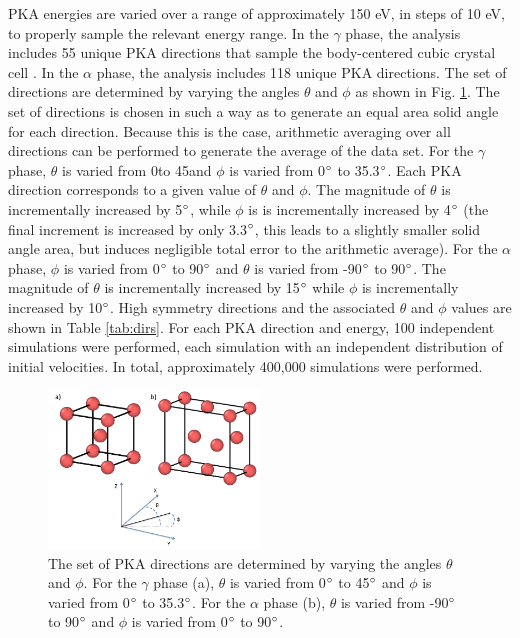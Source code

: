 \documentclass[review]{elsarticle}
\begin{document}
PKA energies are varied over a range of approximately 150 eV, in steps of 10 eV, to properly sample the relevant energy range. In the $\gamma$ phase, the analysis includes 55 unique PKA directions that sample the body-centered cubic crystal cell \cite{beeler2015}. In the $\alpha$ phase, the analysis includes 118 unique PKA directions. The set of directions are determined by varying the angles $\theta$ and $\phi$ as shown in Fig. \ref{fig:directions}. The set of directions is chosen in such a way as to generate an equal area solid angle for each direction. Because this is the case, arithmetic averaging over all directions can be performed to generate the average of the data set. For the $\gamma$ phase, $\theta$ is varied from 0\degree to 45\degree and $\phi$ is varied from 0$\degree$ to 35.3$\degree$. Each PKA direction corresponds to a given value of $\theta$ and $\phi$. The magnitude of $\theta$ is incrementally increased by 5$\degree$, while $\phi$ is is incrementally increased by 4$\degree$ (the final increment is increased by only 3.3$\degree$, this leads to a slightly smaller solid angle area, but induces negligible total error to the arithmetic average). For the $\alpha$ phase, $\phi$ is varied from 0$\degree$ to 90$\degree$ and $\theta$ is varied from -90$\degree$ to 90$\degree$. The magnitude of $\theta$ is incrementally increased by 15$\degree$  while $\phi$ is incrementally increased by 10$\degree$. High symmetry directions and the associated $\theta$ and $\phi$ values are shown in Table \ref{tab:dirs}. For each PKA direction and energy, 100 independent simulations were performed, each simulation with an independent distribution of initial velocities. In total, approximately 400,000 simulations were performed. 

\begin{figure}[h]
 \centering
 \includegraphics[width=0.5\textwidth]{directionsC.png} 
 \caption{The set of PKA directions are determined by varying the angles $\theta$ and $\phi$. For the $\gamma$ phase (a), $\theta$ is varied from 0$\degree$ to 45$\degree$ and $\phi$ is varied from 0$\degree$ to 35.3$\degree$. For the $\alpha$ phase (b), $\theta$ is varied from -90$\degree$ to 90$\degree$ and $\phi$ is varied from 0$\degree$ to 90$\degree$.}
 \label{fig:directions}
\end{figure}
\end{document}
